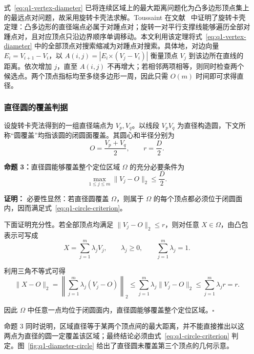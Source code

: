 \documentclass[withoutpreface,bwprint]{cumcmthesis}
\begin{document}
式~\eqref{eq:q1-vertex-diameter} 已将连续区域上的最大距离问题化为凸多边形顶点集上的最远点对问题，故采用旋转卡壳法求解。Toussaint 在文献~\cite{toussaint1983} 中证明了旋转卡壳定理：凸多边形的直径端点必属于对踵点对；旋转一对平行支撑线能够遍历全部对踵点对，且对应顶点只沿边界顺序单调移动。本文利用该定理将式~\eqref{eq:q1-vertex-diameter} 中的全部顶点对搜索缩减为对踵点对搜索。具体地，对边向量 $E_i=V_{i+1}-V_i$，以 $A(i,j)=|E_i\mathbin{\boldsymbol{\times}}(V_j-V_i)|$ 衡量顶点 $V_j$ 到该边所在直线的距离。依次增加 $j$，直至 $A(i,j)$ 不再增大；若相邻两项相等，则同时检查两个候选点。两个顶点指标均至多绕多边形一周，因此只需 $O(m)$ 时间即可求得直径。

\subsubsection{直径圆的覆盖判据}

设旋转卡壳法得到的一组直径端点为 $V_p,V_q$。以线段 $V_pV_q$ 为直径构造圆，下文所称“圆覆盖”均指该圆的闭圆面覆盖。其圆心和半径分别为
\begin{equation}
  O=\frac{V_p+V_q}{2},\qquad r=\frac{D}{2}.
  \label{eq:q1-diameter-circle}
\end{equation}

\noindent\textbf{命题 3：}{\kaishu 直径圆能够覆盖整个定位区域 $\Omega$ 的充分必要条件为}
\begin{equation}
  \max_{1\leq j\leq m}\|V_j-O\|_2\leq\frac{D}{2}.
  \label{eq:q1-circle-criterion}
\end{equation}

\noindent\textbf{证明：}
必要性显然：若直径圆覆盖 $\Omega$，则属于 $\Omega$ 的每个顶点都必须位于闭圆面内，因而满足式~\eqref{eq:q1-circle-criterion}。

下面证明充分性。若全部顶点均满足 $\|V_j-O\|_2\leq r$，则对任意 $X\in\Omega$，由凸包表示可写成
\begin{equation}
  X=\sum_{j=1}^{m}\lambda_jV_j,\qquad
  \lambda_j\geq0,\qquad \sum_{j=1}^{m}\lambda_j=1.
\end{equation}

利用三角不等式可得
\begin{equation}
  \|X-O\|_2
  =\left\|\sum_{j=1}^{m}\lambda_j(V_j-O)\right\|_2
  \leq\sum_{j=1}^{m}\lambda_j\|V_j-O\|_2
  \leq\sum_{j=1}^{m}\lambda_jr=r.
\end{equation}

因此 $\Omega$ 中任意一点均位于闭圆面内，直径圆能够覆盖整个定位区域。\hfill$\square$

命题 3 同时说明，区域直径等于某两个顶点间的最大距离，并不能直接推出以这两点为直径的圆一定覆盖该区域；最终结论必须由式~\eqref{eq:q1-circle-criterion} 判定。图~\ref{fig:q1-diameter-circle} 给出了直径圆未覆盖第三个顶点的几何示意。
\end{document}
